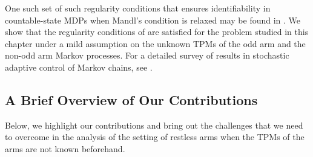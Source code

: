  One such set of such regularity conditions that ensures identifiability in countable-state MDPs when Mandl's condition is relaxed may be found in  \cite{borkar1982identification}. We show that the regularity conditions of \cite{borkar1982identification} are satisfied for the problem studied in this chapter under a mild assumption on the unknown TPMs of the odd arm and the non-odd arm Markov processes. For a detailed survey of results in stochastic adaptive control of Markov chains, see \cite{kumar1985survey}.
 
\subsection{A Brief Overview of Our Contributions}
Below, we highlight our contributions and bring out the challenges that we need to overcome in the analysis of the setting of restless arms when the TPMs of the arms are not known beforehand.
